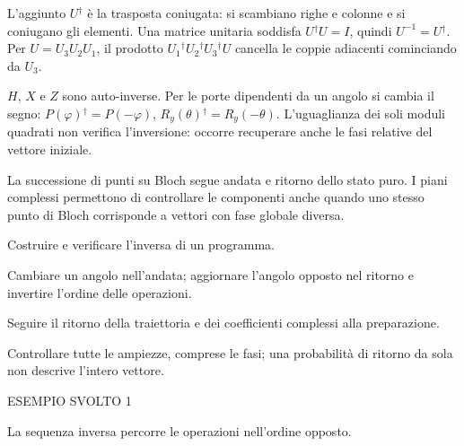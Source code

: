 L'aggiunto \(U{}^{\dagger} \) è la trasposta coniugata: si scambiano righe e colonne e si coniugano gli elementi. Una matrice unitaria soddisfa \(U{}^{\dagger} U=I\), quindi \(U^{-1}=U{}^{\dagger} \). Per \(U=U_{3}U_{2}U_{1}\), il prodotto \(U_{1}{}^{\dagger} U_{2}{}^{\dagger} U_{3}{}^{\dagger} U\) cancella le coppie adiacenti cominciando da \(U_{3}\).\par

\(H\), \(X\) e \(Z\) sono auto-inverse. Per le porte dipendenti da un angolo si cambia il segno: \(P(\varphi ){}^{\dagger} =P(- \varphi )\), \(R_{y}(\theta ){}^{\dagger} =R_{y}(- \theta )\). L'uguaglianza dei soli moduli quadrati non verifica l'inversione: occorre recuperare anche le fasi relative del vettore iniziale.\par



La successione di punti su Bloch segue andata e ritorno dello stato puro. I piani complessi permettono di controllare le componenti anche quando uno stesso punto di Bloch corrisponde a vettori con fase globale diversa.\par



Costruire e verificare l'inversa di un programma.\par

Cambiare un angolo nell'andata; aggiornare l'angolo opposto nel ritorno e invertire l'ordine delle operazioni.\par

Seguire il ritorno della traiettoria e dei coefficienti complessi alla preparazione.\par

Controllare tutte le ampiezze, comprese le fasi; una probabilità di ritorno da sola non descrive l'intero vettore.\par


\Needspace{.36\textheight}\label{c3-inversa-example-1}
{\sffamily\small\color{Accent} ESEMPIO SVOLTO 1\par}
La sequenza inversa percorre le operazioni nell'ordine opposto.\par


